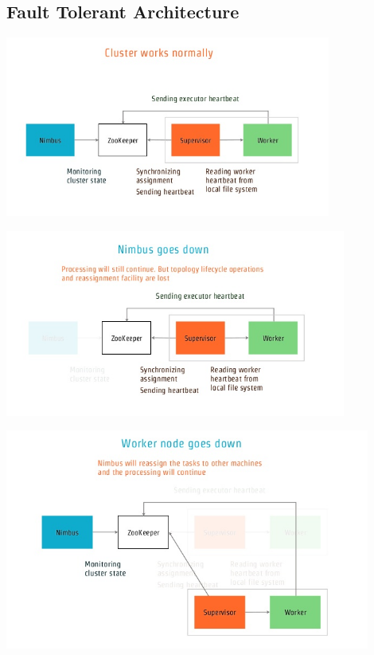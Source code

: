 \subsection*{Fault Tolerant Architecture} 
\begin{center}
\includegraphics[scale=.7]{../img/img9} \\[2mm]
\end{center}
\begin{center}
\includegraphics[scale=.7]{../img/img10} \\[2mm]
\end{center}
\begin{center}
\includegraphics[scale=.7]{../img/img11} \\[2mm]
\end{center}
